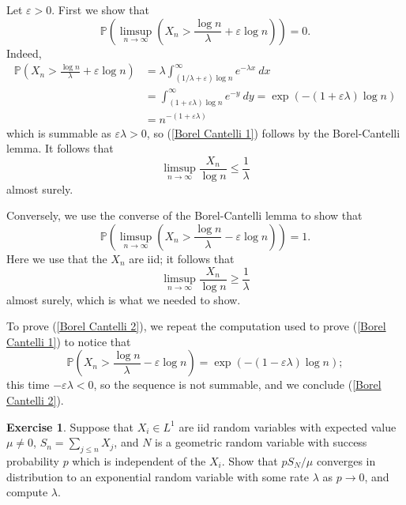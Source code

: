 \documentclass[10pt]{article}
\newcommand{\PP}{\mathbb P}
\theoremstyle{definition}
\newtheorem{exer}{Exercise}
\begin{document}
Let $\varepsilon > 0$.
First we show that
\begin{equation}
\label{Borel Cantelli 1}
\PP\left(\limsup_{n \to \infty}\left(X_n > \frac{\log n}{\lambda} + \varepsilon \log n\right)\right) = 0.
\end{equation}
Indeed,
\begin{align*}
\PP\left(X_n > \frac{\log n}{\lambda} + \varepsilon \log n\right) &= \lambda \int_{(1/\lambda + \varepsilon) \log n}^\infty e^{-\lambda x} ~dx \\
&= \int_{(1 + \varepsilon\lambda) \log n}^\infty e^{-y}~dy = \exp(-(1 + \varepsilon\lambda) \log n)
\\
&= n^{-(1 + \varepsilon\lambda)}
\end{align*}
which is summable as $\varepsilon\lambda > 0$, so (\ref{Borel Cantelli 1}) follows by the Borel-Cantelli lemma. It follows that
$$\limsup_{n \to \infty}\frac{X_n}{\log n} \leq \frac{1}{\lambda}$$
almost surely.

Conversely, we use the converse of the Borel-Cantelli lemma to show that
\begin{equation}
\label{Borel Cantelli 2}
\PP\left(\limsup_{n \to \infty}\left(X_n > \frac{\log n}{\lambda} - \varepsilon \log n\right)\right) = 1.
\end{equation}
Here we use that the $X_n$ are iid; it follows that
$$\limsup_{n \to \infty}\frac{X_n}{\log n} \geq \frac{1}{\lambda}$$
almost surely, which is what we needed to show.

To prove (\ref{Borel Cantelli 2}), we repeat the computation used to prove (\ref{Borel Cantelli 1}) to notice that
$$\PP\left(X_n > \frac{\log n}{\lambda} - \varepsilon \log n\right) = \exp(-(1-\varepsilon\lambda) \log n);$$
this time $-\varepsilon\lambda < 0$, so the sequence is not summable, and we conclude (\ref{Borel Cantelli 2}).

\begin{exer}
Suppose that $X_i \in L^1$ are iid random variables with expected value $\mu \neq 0$, $S_n = \sum_{j \leq n} X_j$, and $N$ is a geometric random variable with success probability $p$ which is independent of the $X_i$.
Show that $pS_N/\mu$ converges in distribution to an exponential random variable with some rate $\lambda$ as $p \to 0$, and compute $\lambda$.
\end{exer}
\end{document}
